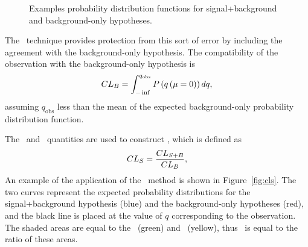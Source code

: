 \begin{figure}
  \centering
  \caption{
    Examples probability distribution functions for signal+background and
    background-only hypotheses.
  }
  \label{fig:example_pdfs}
\end{figure}

The \cls\ technique provides protection from this sort of error by including
the agreement with the background-only hypothesis.
The compatibility of the observation with the background-only hypothesis is
\begin{equation}
  CL_{B} = \int_{-\inf}^{q_\mathrm{obs}} P\left(q\left(\mu=0\right)\right) dq,
\end{equation}
assuming $q_\mathrm{obs}$ less than the mean of the expected background-only
probability distribution function.

The \clsb\ and \clb\ quantities are used to construct \cls, which is defined as
\begin{equation}
  CL_{S} = \frac{CL_{S+B}}{CL_{B}},
\end{equation}
An example of the application of the \cls\ method is shown in
Figure~\ref{fig:cls}.
The two curves represent the expected probability distributions for the
signal+background hypothesis (blue) and the background-only hypotheses (red),
and the black line is placed at the value of $q$ corresponding to the
observation.
The shaded areas are equal to the \clsb\ (green) and \clb\ (yellow), thus
\cls\ is equal to the ratio of these areas.

